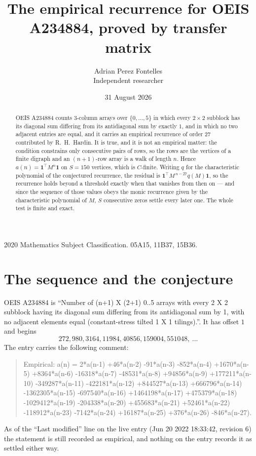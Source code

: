 \documentclass[11pt,a4paper]{article}
\title{The empirical recurrence for OEIS A234884, proved by transfer matrix}
\author{Adrian Perez Fontelles\\ \small Independent researcher}
\date{31 August 2026}
\theoremstyle{plain}
\theoremstyle{definition}
\begin{document}
\maketitle

\begin{abstract}
OEIS A234884 counts $3$-column arrays over $\{0,\dots,5\}$ in which every
$2\times2$ subblock has its diagonal sum differing from its antidiagonal sum by
exactly $1$, and in which no two adjacent entries are equal, and it
carries an empirical recurrence of order $27$ contributed by R.~H.~Hardin. It is true,
and it is not an empirical matter: the condition constrains only consecutive pairs of rows,
so the rows are the vertices of a finite digraph and an $(n+1)$-row array is a walk of
length $n$. Hence $a(n)=\mathbf{1}^{\!\top}M^{n}\mathbf{1}$ on $S=150$ vertices, which
is $C$-finite. Writing $q$ for the characteristic polynomial of the conjectured recurrence,
the residual is $\mathbf{1}^{\!\top}M^{\,n-27}q(M)\mathbf{1}$, so the recurrence
holds beyond a threshold exactly when that vanishes from then on --- and since the sequence
of those values obeys the monic recurrence given by the characteristic polynomial of $M$,
$S$ consecutive zeros settle every later one. The whole test is finite and exact.
\end{abstract}

\noindent\small 2020 Mathematics Subject Classification. 05A15, 11B37, 15B36.\normalsize

\section{The sequence and the conjecture}

OEIS A234884 is ``Number of (n+1) X (2+1) 0..5 arrays with every 2 X 2 subblock having its diagonal sum differing from its antidiagonal sum by 1, with no adjacent elements equal (constant-stress tilted 1 X 1 tilings).''. It has offset
$1$ and begins
\[
272, 980, 3164, 11984, 40856, 159004, 551048,\ \dots
\]
The entry carries the following comment:
\begin{quote}\small
Empirical: a(n) = 2*a(n-1) +46*a(n-2) -91*a(n-3) -852*a(n-4) +1670*a(n-5) +8364*a(n-6) -16318*a(n-7) -48531*a(n-8) +94856*a(n-9) +177211*a(n-10) -349287*a(n-11) -422181*a(n-12) +844527*a(n-13) +666796*a(n-14) -1362305*a(n-15) -697540*a(n-16) +1464198*a(n-17) +475379*a(n-18) -1029412*a(n-19) -204338*a(n-20) +455683*a(n-21) +52461*a(n-22) -118912*a(n-23) -7142*a(n-24) +16187*a(n-25) +376*a(n-26) -846*a(n-27).
\end{quote}
As of the ``Last modified'' line on the live entry (Jun 20 2022 18:33:42, revision 6) the statement is
still recorded as empirical, and nothing on the entry records it as settled either way.
\end{document}
